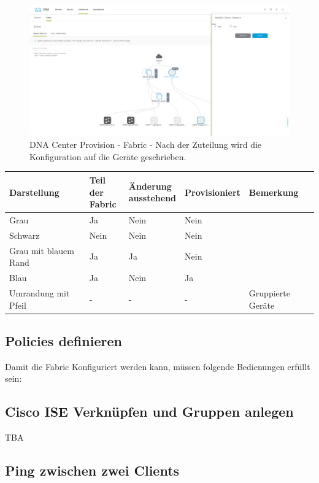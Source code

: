 \begin{figure}[H]
	\centering
	\includegraphics[width=16cm]{img/dna-center-fabric-1.png}
	\caption{DNA Center Provision - Fabric - Nach der Zuteilung wird die Konfiguration auf die Geräte geschrieben.}
	\label{fig:IP Base and Services}
\end{figure}


\begin{tabular}{| l | l | l | l | l |}
	\hline
	\textbf{Darstellung} & \makecell{\textbf{Teil der}\\ \textbf{Fabric}} & \makecell{\textbf{Änderung}\\ \textbf{ausstehend}} & \textbf{Provisioniert} & \textbf{Bemerkung} \\
	\hline
	Grau & Ja & Nein & Nein & \\
	Schwarz & Nein & Nein & Nein & \\
	Grau mit blauem Rand & Ja & Ja & Nein & \\
	Blau & Ja & Nein & Ja & \\
	Umrandung mit Pfeil & - & - & - & Gruppierte Geräte\\	
	\hline
\end{tabular}

\subsection{Policies definieren}
Damit die Fabric Konfiguriert werden kann, müssen folgende Bedienungen erfüllt sein: 

\subsection{Cisco ISE Verknüpfen und Gruppen anlegen}
TBA

\subsection{Ping zwischen zwei Clients}

